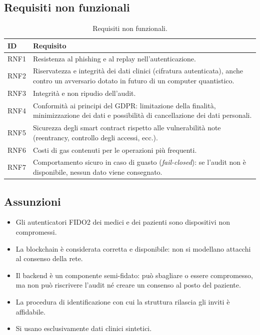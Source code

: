 \subsection{Requisiti non funzionali}
\begin{table}[H]
\centering\small
\begin{tabular}{@{}l p{}@{}}
\toprule
ID & Requisito\\
\midrule
RNF1 & Resistenza al phishing e al replay nell'autenticazione.\\
RNF2 & Riservatezza e integrità dei dati clinici (cifratura autenticata), anche contro un avversario dotato in futuro di un computer quantistico.\\
RNF3 & Integrità e non ripudio dell'audit.\\
RNF4 & Conformità ai principi del GDPR: limitazione della finalità, minimizzazione dei dati e possibilità di cancellazione dei dati personali.\\
RNF5 & Sicurezza degli smart contract rispetto alle vulnerabilità note (reentrancy, controllo degli accessi, ecc.).\\
RNF6 & Costi di gas contenuti per le operazioni più frequenti.\\
RNF7 & Comportamento sicuro in caso di guasto (\emph{fail-closed}): se l'audit non è disponibile, nessun dato viene consegnato.\\
\bottomrule
\end{tabular}
\caption{Requisiti non funzionali.}
\end{table}

\subsection{Assunzioni}
\begin{itemize}
  \item Gli autenticatori FIDO2 dei medici e dei pazienti sono dispositivi non compromessi.
  \item La blockchain è considerata corretta e disponibile: non si modellano attacchi al consenso della rete.
  \item Il backend è un componente semi-fidato: può sbagliare o essere compromesso, ma non può riscrivere l'audit né creare un consenso al posto del paziente.
  \item La procedura di identificazione con cui la struttura rilascia gli inviti è affidabile.
  \item Si usano esclusivamente dati clinici sintetici.
\end{itemize}

